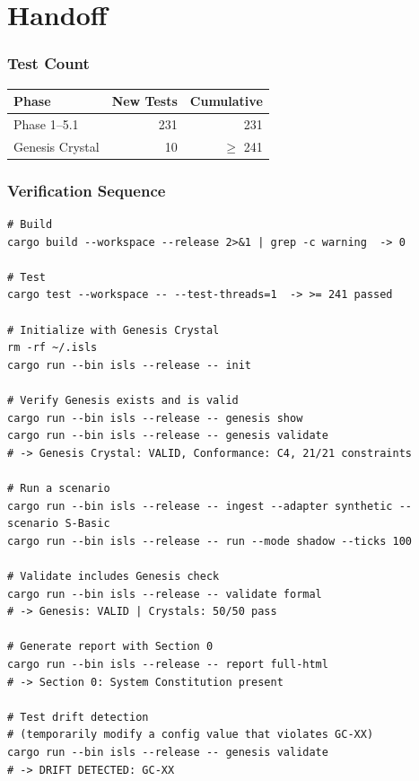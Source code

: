 \documentclass[11pt,a4paper,twoside]{article}
\theoremstyle{definition}
\theoremstyle{plain}
\theoremstyle{remark}
\begin{document}
\part{Handoff}\label{part:handoff}

\section{Test Count}

\begin{tabular}{l r r}
\toprule
\textbf{Phase} & \textbf{New Tests} & \textbf{Cumulative} \\
\midrule
Phase 1--5.1 & 231 & 231 \\
Genesis Crystal & 10 & $\ge$ 241 \\
\bottomrule
\end{tabular}

\section{Verification Sequence}

\begin{lstlisting}
# Build
cargo build --workspace --release 2>&1 | grep -c warning  -> 0

# Test
cargo test --workspace -- --test-threads=1  -> >= 241 passed

# Initialize with Genesis Crystal
rm -rf ~/.isls
cargo run --bin isls --release -- init

# Verify Genesis exists and is valid
cargo run --bin isls --release -- genesis show
cargo run --bin isls --release -- genesis validate
# -> Genesis Crystal: VALID, Conformance: C4, 21/21 constraints

# Run a scenario
cargo run --bin isls --release -- ingest --adapter synthetic --scenario S-Basic
cargo run --bin isls --release -- run --mode shadow --ticks 100

# Validate includes Genesis check
cargo run --bin isls --release -- validate formal
# -> Genesis: VALID | Crystals: 50/50 pass

# Generate report with Section 0
cargo run --bin isls --release -- report full-html
# -> Section 0: System Constitution present

# Test drift detection
# (temporarily modify a config value that violates GC-XX)
cargo run --bin isls --release -- genesis validate
# -> DRIFT DETECTED: GC-XX
\end{lstlisting}
\end{document}
